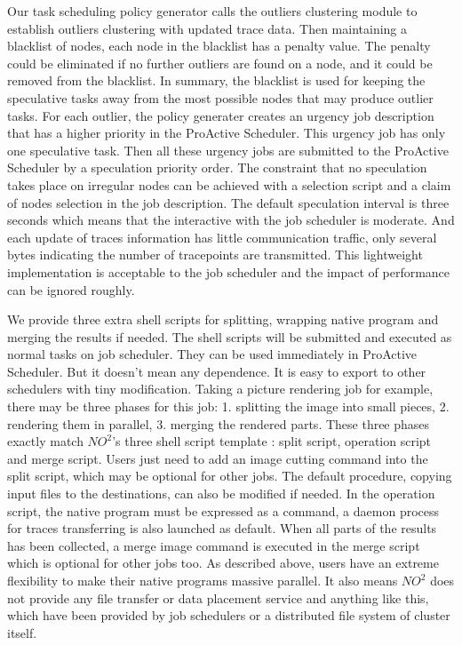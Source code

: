 Our task scheduling policy generator calls the outliers clustering module to establish
outliers clustering with updated trace data. Then maintaining a blacklist of nodes, each
node in the blacklist has a penalty value. The penalty could be eliminated if no further
outliers are found on a node, and it could be removed from the blacklist. In summary, the
blacklist is used for keeping the speculative tasks away from the most possible nodes that
may produce outlier tasks. For each outlier, the policy generater creates an urgency job
description that has a higher priority in the ProActive Scheduler. This urgency job has
only one speculative task. Then all these urgency jobs are submitted to the ProActive
Scheduler by a speculation priority order. The constraint that no speculation takes place
on irregular nodes can be achieved with a selection script and a claim of nodes selection
in the job description. The default speculation interval is three seconds which means that the
interactive with the job scheduler is moderate. And each update of traces information has
little communication traffic, only several bytes indicating the number of tracepoints are
transmitted. This lightweight implementation is acceptable to the job scheduler and the
impact of performance can be ignored roughly.

We provide three extra shell scripts for splitting, wrapping native program and merging
the results if needed. The shell scripts will be submitted and executed as normal tasks on
job scheduler. They can be used immediately in ProActive Scheduler. But it doesn't mean
any dependence. It is easy to export to other schedulers with tiny modification. Taking a
picture rendering job for example, there may be three phases for this job: 1. splitting
the image into small pieces, 2. rendering them in parallel, 3. merging the rendered parts.
These three phases exactly match $NO^2$'s three shell script template : split script,
operation script and merge script. Users just need to add an image cutting command into
the split script, which may be optional for other jobs. The default procedure, copying
input files to the destinations, can also be modified if needed. In the operation script,
the native program must be expressed as a command, a daemon process for traces
transferring is also launched as default. When all parts of the results has been
collected, a merge image command is executed in the merge script which is optional for other jobs
too. As described above,  users have an extreme flexibility to make their native programs
massive parallel. It also means $NO^2$ does not provide any file transfer or
data placement service and anything like this, which have been provided by job schedulers or a
distributed file system of cluster itself.
